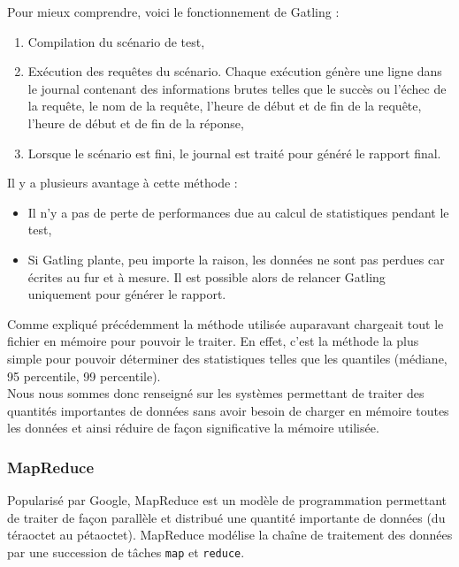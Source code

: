 Pour mieux comprendre, voici le fonctionnement de Gatling :
\begin{enumerate}
 \item Compilation du scénario de test,
 \item Exécution des requêtes du scénario. Chaque exécution génère une ligne dans le journal contenant des informations brutes telles que le succès ou l'échec de la requête, le nom de la requête, l'heure de début et de fin de la requête, l'heure de début et de fin de la réponse,
 \item Lorsque le scénario est fini, le journal est traité pour généré le rapport final.\\
\end{enumerate}

Il y a plusieurs avantage à cette méthode :
\begin{itemize}
 \item Il n'y a pas de perte de performances due au calcul de statistiques pendant le test,
 \item Si Gatling plante, peu importe la raison, les données ne sont pas perdues car écrites au fur et à mesure. Il est possible alors de relancer Gatling uniquement pour générer le rapport.\\
\end{itemize}

Comme expliqué précédemment la méthode utilisée auparavant chargeait tout le fichier en mémoire pour pouvoir le traiter. En effet, c'est la méthode la plus simple pour pouvoir déterminer des statistiques telles que les quantiles (médiane, 95\ieme{} percentile, 99\ieme{} percentile).\\

Nous nous sommes donc renseigné sur les systèmes permettant de traiter des quantités importantes de données sans avoir besoin de charger en mémoire toutes les données et ainsi réduire de façon significative la mémoire utilisée.

\subsubsection{MapReduce}

Popularisé par Google, MapReduce est un modèle de programmation permettant de traiter de façon parallèle et distribué une quantité importante de données (du téraoctet au pétaoctet). MapReduce modélise la chaîne de traitement des données par une succession de tâches \verb+map+ et \verb+reduce+.\\


